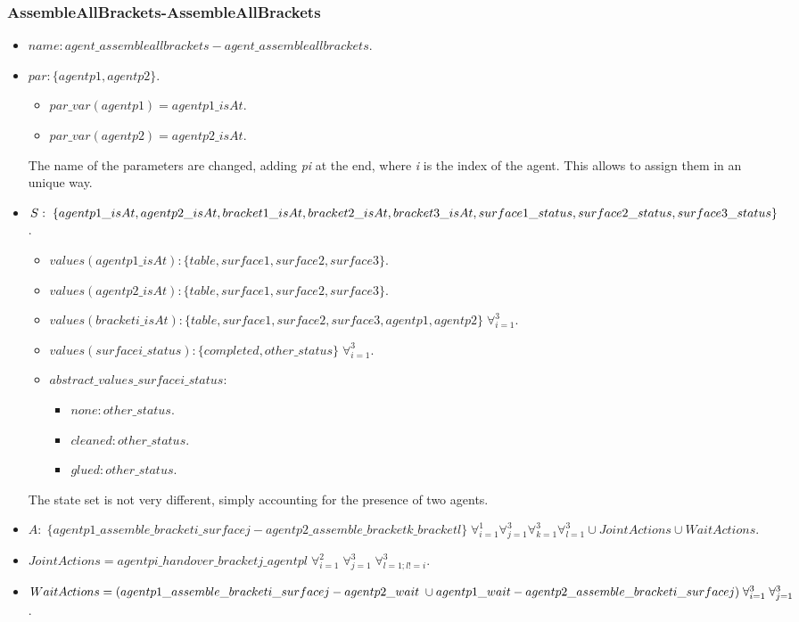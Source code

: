 \subsubsection{AssembleAllBrackets-AssembleAllBrackets}
\begin{itemize}
	\item $name: agent\_assembleallbrackets-agent\_assembleallbrackets$.
	\item		$par: \{agentp1,agentp2\}$.
		\begin{itemize}
			\item $par\_var(agentp1)=agentp1\_isAt$.
			\item $par\_var(agentp2)=agentp2\_isAt$.
		\end{itemize}

		The name of the parameters are changed, adding \textit{pi} at the end, where \textit{i} is the index of the agent. This allows to assign them in an unique way.
	\item $S:\;\{agentp1\_isAt,agentp2\_isAt, bracket1\_isAt,bracket2\_isAt,bracket3\_isAt,\\
	surface1\_status,surface2\_status,surface3\_status\}$. 
		\begin{itemize}
			\item $values(agentp1\_isAt):\{table,surface1,surface2,surface3\}$.
			\item $values(agentp2\_isAt):\{table,surface1,surface2,surface3\}$.
			\item $values(bracketi\_isAt):\{table,surface1,surface2,surface3,agentp1,agentp2\}\; \forall_{i=1}^3$. 
			\item $values(surfacei\_status):\{completed,other\_status\}\;\forall_{i=1}^3$.
		\end{itemize}
		\begin{itemize}
			\item $abstract\_values\_surfacei\_status:$ 
				\begin{itemize}
					\item $none: other\_status$.
					\item $cleaned: other\_status$.
					\item $glued: other\_status$.
				\end{itemize}
		\end{itemize}
		The state set is not very different, simply accounting for the presence of two agents.

	\item $A:\;\{agentp1\_assemble\_bracketi\_surfacej-agentp2\_assemble\_bracketk\_bracketl\}\;\forall_{i=1}^1 \forall_{j=1}^3
	\forall_{k=1}^3 \forall_{l=1}^3 \cup JointActions \cup WaitActions$.
	\item $JointActions=agentpi\_handover\_bracketj\_agentpl \; \forall_{i=1}^2 \; \forall_{j=1}^3 \; \forall_{l=1; l!=i}^3$.
	\item $WaitActions=(agentp1\_assemble\_bracketi\_surfacej-agentp2\_wait \; \cup \\
	 agentp1\_wait-agentp2\_assemble\_bracketi\_surfacej) \; \forall_{i=1}^3 \; \forall_{j=1}^3$.


\end{itemize}

